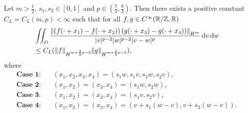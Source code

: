 \begin{theorem}\label{thm:fracLeibnizrule}
	Let $m> \frac{1}{2}$, $s_1,s_2 \in [0,1]$ and $p \in (\frac 73,\frac 83)$. Then there exists a positive constant $C_L = C_L(m, p) < \infty$  such that for all $f,g \in  C^\infty(\mathbb{R}/\mathbb{Z},\mathbb{R})$
	\begin{align*}\label{eq:fracLeibnizrule}
	& \iint_D   \frac{ \left\| \left(f(\cdot+x_1) - f(\cdot+x_2) \right) \left(g(\cdot+x_3) - g(\cdot+x_4) \right) \right\|_{H^m}}{|v|^{p-2}|w|^{p-2}|v-w|^{p}}  \d v \d w \nonumber  \\
	&  \leq C_L ( \|f\|_{H^{m+ \frac 32 p -3}} \|g\|_{H^{m+ \frac 32 p -3 }} ),
	\end{align*}
	where 
	\[
	\begin{split}
	\textbf{Case 1:} & \quad (x_1,x_2,x_3,x_4) =(s_1w,s_1v, s_2w, s_2v), \\
	\textbf{Case 2:} & \quad (x_1,x_2)=(x_3,x_4) = (s_1w,s_2w), \\
	\textbf{Case 3:} & \quad (x_1,x_2)=(x_3,x_4) = (s_1v, s_2v), \\
	\textbf{Case 4:} & \quad (x_1,x_2)=(x_3,x_4) = (v+s_1(w-v), v+s_2(w-v)).
	\end{split}
	\]
\end{theorem}
